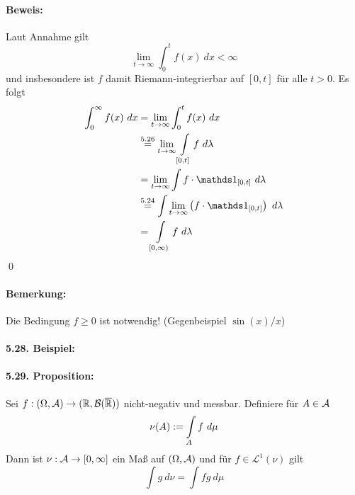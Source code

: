  \paragraph{Beweis:}Laut Annahme gilt
 $$\lim_{t\to\infty}\int_0^tf(x)\ dx<\infty$$
 und insbesondere ist $f$ damit Riemann-integrierbar auf $[0,t]$ f\"ur alle $t>0$. Es folgt
 \begin{align*}
     \int_0^\infty f(x)\ dx&=\lim_{t\to\infty}\int_0^tf(x)\ dx\\&\overset{5.26}{=}\lim_{t\to\infty}\int\displaylimits_{[0,t]}f\ d\lambda\\
     &=\lim_{t\to\infty}\int f\cdot\ind{[0,t]}\ d\lambda\\
     &\overset{5.24}{=}\int \lim_{t\to\infty}\left(f\cdot\ind{[0,t]}\right)\ d\lambda\\
     &=\int\displaylimits_{[0,\infty)}f\ d\lambda
 \end{align*} 
 \qed
 
 \paragraph{Bemerkung:}Die Bedingung $f\geq0$ ist notwendig! (Gegenbeispiel $\sin (x)/x$)
 
 \paragraph{5.28. Beispiel:} %
 
 \paragraph{5.29. Proposition:}Sei $f:(\Omega,\mathcal{A})\to(\mathbb{R},\mathcal{B}(\overline{\mathbb{R}}))$ nicht-negativ und messbar. Definiere f\"ur $A\in\mathcal{A}$ 
 $$\nu(A):=\int\displaylimits_A f\ d\mu$$
 Dann ist $\nu:\mathcal{A}\to[0,\infty]$ ein Ma\ss{} auf $(\Omega,\mathcal{A})$ und f\"ur $f\in\mathcal{L}^1(\nu)$ gilt
 $$\int g\ d\nu=\int fg\ d\mu$$
 
